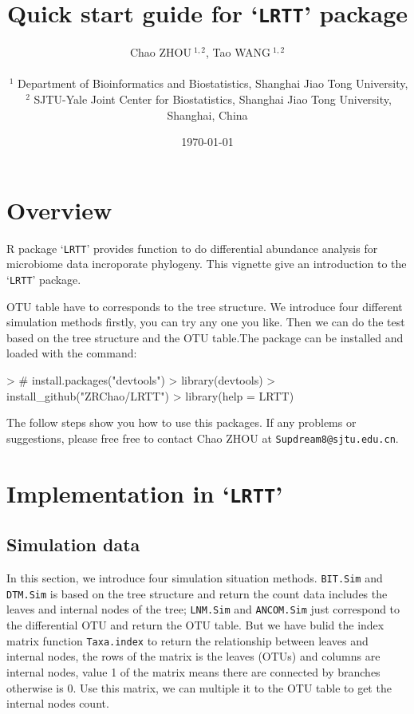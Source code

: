 \documentclass[a4paper]{article}
\title{Quick start guide for `\texttt{LRTT}' package}
\author{Chao ZHOU$~^{1,2}$, Tao WANG$~^{1,2}$ \\
\\
$~^1$ Department of Bioinformatics and Biostatistics, Shanghai Jiao Tong University, \\
$~^2$ SJTU-Yale Joint Center for Biostatistics, Shanghai Jiao Tong University, \\Shanghai, China\\
}
\date{\today}
\newcommand{\code}{\texttt}
\begin{document}


\maketitle


\section{Overview}

  R package `\texttt{LRTT}' provides function to do differential abundance analysis for microbiome data incroporate phylogeny. This vignette give an introduction to the `\texttt{LRTT}' package.

  OTU table have to corresponds to the tree structure. We introduce four different simulation methods firstly, you can try any one you like. Then we can do the test based on the tree structure and the OTU table.The package can be installed and loaded with the command:


\begin{Schunk}
\begin{Sinput}
> # install.packages("devtools")
> library(devtools)
> install_github("ZRChao/LRTT")
> library(help = LRTT)
\end{Sinput}
\end{Schunk}

  The follow steps show you how to use this packages. If any problems or suggestions, please free free to contact Chao ZHOU at \texttt{Supdream8@sjtu.edu.cn}.

\section{Implementation in `\texttt{LRTT}'}


\subsection{Simulation data}\label{LRTT}

  In this section, we introduce four simulation situation methods. \code{BIT.Sim} and \code{DTM.Sim} is based on the tree structure and return the count data includes the leaves and internal nodes of the tree; \code{LNM.Sim} and \code{ANCOM.Sim} just correspond to the differential OTU and return the OTU table. But we have bulid the index matrix function \code{Taxa.index} to return the relationship between leaves and internal nodes, the rows of the matrix is the leaves (OTUs) and columns are internal nodes, value 1 of the matrix means there are connected by branches otherwise is 0. Use this matrix, we can multiple it to the OTU table to get the internal nodes count.
\end{document}
